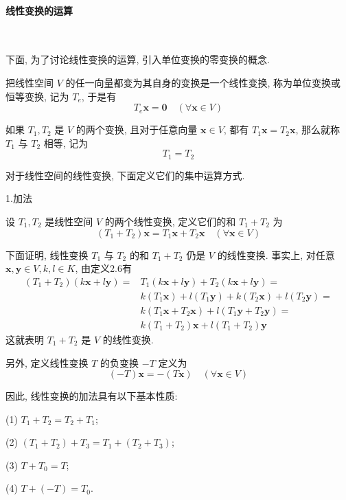 \paragraph[]{线性变换的运算} \

\par 下面, 为了讨论线性变换的运算, 引入单位变换的零变换的概念.

\par 把线性空间 $V$ 的任一向量都变为其自身的变换是一个线性变换, 称为单位变换或
恒等变换, 记为 $T_e$, 于是有
$$
    T_e \bm{x} = \bm{0} \quad (\forall \bm{x} \in V)
$$

\par 如果 $T_1, T_2$ 是 $V$ 的两个变换, 且对于任意向量 $\bm{x} \in V$, 都有 $T_1\bm{x} = T_2\bm{x}$, 那么就称
$T_1$ 与 $T_2$ 相等, 记为
$$
    T_1 = T_2
$$

\par 对于线性空间的线性变换, 下面定义它们的集中运算方式.

\par{1.加法}

\par 设 $T_1, T_2$ 是线性空间 $V$ 的两个线性变换, 定义它们的和 $T_1 + T_2$ 为
$$
    (T_1 + T_2) \bm{x} = T_1 \bm{x} + T_2 \bm{x} \quad (\forall \bm{x} \in V)
$$
\par 下面证明, 线性变换 $T_1$ 与 $T_2$ 的和 $T_1 + T_2$ 仍是 $V$ 的线性变换. 事实上, 对任意
$\bm{x}, \bm{y} \in V, k, l \in K$, 由定义2.6有
\begin{align*}
    (T_1 + T_2)(k\bm{x} + l\bm{y}) = & T_1(k\bm{x} + l\bm{y}) + T_2(k\bm{x} + l\bm{y}) =           \\
                                     & k(T_1\bm{x}) + l(T_1\bm{y}) + k(T_2\bm{x}) + l(T_2\bm{y}) = \\
                                     & k(T_1\bm{x} + T_2\bm{x}) + l(T_1\bm{y} + T_2\bm{y}) =       \\
                                     & k(T_1 + T_2)\bm{x} + l(T_1 + T_2)\bm{y}
\end{align*}
这就表明 $T_1 + T_2$ 是 $V$ 的线性变换.

\par 另外, 定义线性变换 $T$ 的负变换 $-T$ 定义为
$$
    (-T)\bm{x} = -(T\bm{x}) \quad (\forall \bm{x} \in V)
$$

\par 因此, 线性变换的加法具有以下基本性质:
\par (1) $T_1 + T_2 = T_2 + T_1$;
\par (2) $(T_1 + T_2) + T_3 = T_1 + (T_2 + T_3)$;
\par (3) $T + T_0 = T$;
\par (4) $T + (-T) = T_0$.

